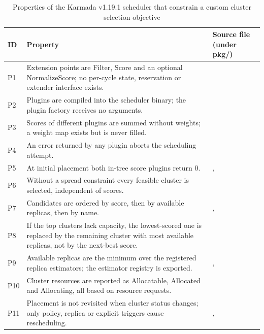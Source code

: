 \begin{table}[t]
\caption{Properties of the Karmada v1.19.1 scheduler that constrain a custom cluster selection objective}\label{tab:karmada}
\centering\small{}
\begin{tabularx}{\textwidth}{@{}p{0.6cm}Lp{5.0cm}@{}}
\toprule
\textbf{ID} & \textbf{Property} & \textbf{Source file (under pkg/)} \\
\midrule
P1 & Extension points are Filter, Score and an optional NormalizeScore; no per-cycle state, reservation or extender interface exists. &  \\
P2 & Plugins are compiled into the scheduler binary; the plugin factory receives no arguments. &  \\
P3 & Scores of different plugins are summed without weights; a weight map exists but is never filled. &  \\
P4 & An error returned by any plugin aborts the scheduling attempt. &  \\
P5 & At initial placement both in-tree score plugins return 0. & ,  \\
P6 & Without a spread constraint every feasible cluster is selected, independent of scores. &  \\
P7 & Candidates are ordered by score, then by available replicas, then by name. & ,  \\
P8 & If the top clusters lack capacity, the lowest-scored one is replaced by the remaining cluster with most available replicas, not by the next-best score. &  \\
P9 & Available replicas are the minimum over the registered replica estimators; the estimator registry is exported. & ,  \\
P10 & Cluster resources are reported as Allocatable, Allocated and Allocating, all based on resource requests. &  \\
P11 & Placement is not revisited when cluster status changes; only policy, replica or explicit triggers cause rescheduling. & ,  \\
\bottomrule
\end{tabularx}
\end{table}


